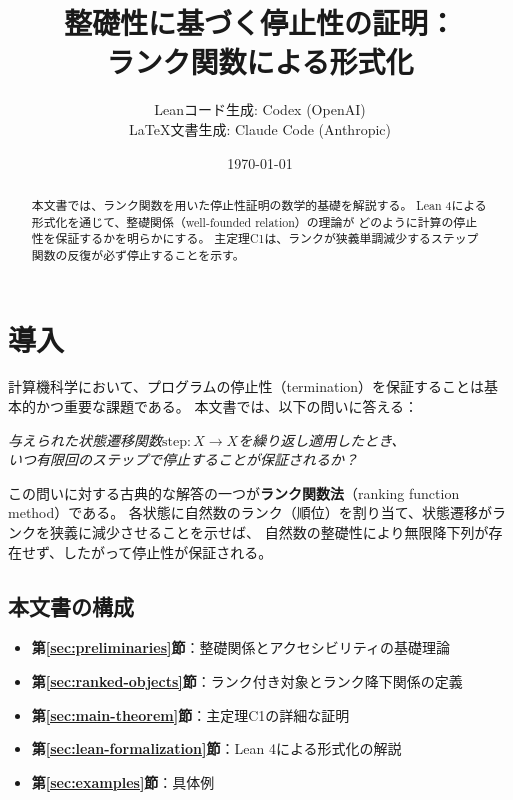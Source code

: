 \documentclass[11pt,a4paper]{ltjsarticle}
\title{整礎性に基づく停止性の証明：\\ランク関数による形式化}
\author{%
  Leanコード生成: Codex (OpenAI)\\
  \LaTeX{}文書生成: Claude Code (Anthropic)%
}
\date{\today}
\theoremstyle{definition}
\begin{document}
\maketitle

\begin{abstract}
本文書では、ランク関数を用いた停止性証明の数学的基礎を解説する。
Lean 4による形式化を通じて、整礎関係（well-founded relation）の理論が
どのように計算の停止性を保証するかを明らかにする。
主定理C1は、ランクが狭義単調減少するステップ関数の反復が必ず停止することを示す。
\end{abstract}

\tableofcontents

\section{導入}

計算機科学において、プログラムの停止性（termination）を保証することは基本的かつ重要な課題である。
本文書では、以下の問いに答える：

\begin{center}
\emph{与えられた状態遷移関数$\mathrm{step}: X \to X$を繰り返し適用したとき、\\
いつ有限回のステップで停止することが保証されるか？}
\end{center}

この問いに対する古典的な解答の一つが\textbf{ランク関数法}（ranking function method）である。
各状態に自然数のランク（順位）を割り当て、状態遷移がランクを狭義に減少させることを示せば、
自然数の整礎性により無限降下列が存在せず、したがって停止性が保証される。

\subsection{本文書の構成}

\begin{itemize}[leftmargin=*]
\item \textbf{第\ref{sec:preliminaries}節}：整礎関係とアクセシビリティの基礎理論
\item \textbf{第\ref{sec:ranked-objects}節}：ランク付き対象とランク降下関係の定義
\item \textbf{第\ref{sec:main-theorem}節}：主定理C1の詳細な証明
\item \textbf{第\ref{sec:lean-formalization}節}：Lean 4による形式化の解説
\item \textbf{第\ref{sec:examples}節}：具体例
\end{itemize}
\end{document}
